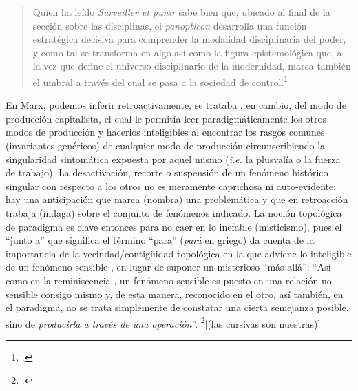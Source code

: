 \begin{quote}
Quien ha leído \emph{Surveiller et punir} sabe bien que, ubicado al final de la sección sobre las disciplinas, el \emph{panopticon} desarrolla una función estratégica decisiva para comprender la modalidad disciplinaria del poder, y como tal se transforma en algo así como la figura epistemológica que, a la vez que define el universo disciplinario de la modernidad, marca también el umbral a través del cual se pasa a la sociedad de control.\footcite[24]{@7070-AGAMBEN2009}
\end{quote}

En Marx, podemos inferir retroactivamente, se trataba , en cambio, del modo de producción capitalista, el cual le permitía leer paradigmáticamente los otros modos de producción y hacerlos inteligibles al encontrar los rasgos comunes (invariantes genéricos) de cualquier modo de producción circunscribiendo la singularidad sintomática expuesta por aquel mismo (\emph{i.e.} la plusvalía o la fuerza de trabajo). La desactivación, recorte o suspensión de un fenómeno histórico singular con respecto a los otros no es meramente caprichosa ni auto-evidente: hay una anticipación que marca (nombra) una problemática y que en retroacción trabaja (indaga) sobre el conjunto de fenómenos indicado. La noción topológica de paradigma es clave entonces para no caer en lo inefable (misticismo), pues el \enquote{junto a} que significa el término \enquote{para} (\emph{pará} en griego) da cuenta de la importancia de la vecindad/contigüidad topológica en la que adviene lo inteligible de un fenómeno sensible , en lugar de suponer un misterioso \enquote{más allá}: \enquote{Así como en la reminiscencia , un fenómeno sensible es puesto en una relación no-sensible consigo mismo y, de esta manera, reconocido en el otro, así también, en el paradigma, no se trata simplemente de constatar una cierta semejanza posible, sino de \emph{producirla a través de una operación}}. \footcite[32]{@7070-AGAMBEN2009}[(las cursivas son nuestras)]


